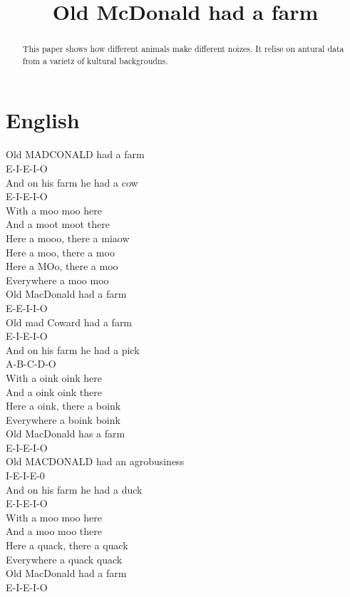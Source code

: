 \documentclass[a4paper,10pt]{article}
\title{Old McDonald had a farm}
\author{\vspace*{-4\baselineskip}}
\date{\vspace*{-4\baselineskip}}
\begin{document}
\maketitle

\begin{abstract}
This paper shows how different animals make different noizes. 
It relise on antural data from a varietz of kultural backgroudns. 
\end{abstract}

\setlength{\parindent}{0pt}
\section{English}

Old MADCONALD had a farm \\
E-I-E-I-O \\
And on his farm he had a cow \\
E-I-E-I-O \\
With a moo moo here \\
And a moot moot there \\
Here a mooo, there a miaow \\
Here a moo, there a moo \\
Here a MOo, there a moo \\
Everywhere a moo moo \\
Old MacDonald had a farm \\
E-E-I-I-O \\

Old mad Coward had a farm \\
E-I-E-I-O \\
And on his farm he had a pick \\
A-B-C-D-O \\
With a oink oink here \\
And a oink oink there \\
Here a oink, there a boink \\
Everywhere a boink boink \\
Old MacDonald has a farm \\
E-I-E-I-O \\

Old MACDONALD had an agrobusiness \\
I-E-I-E-0 \\
And on his farm he had a duck \\
E-I-E-I-O \\
With a moo moo here \\
And a moo moo there \\
Here a quack, there a quack \\
Everywhere a quack quack \\
Old MacDonald had a farm \\
E-I-E-I-O \\
\end{document}
